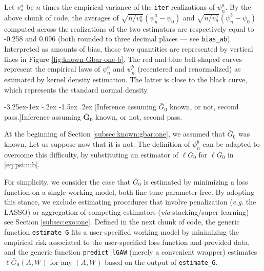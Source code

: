 \documentclass[]{article}
\makeatletter
\renewcommand\subsection{\@startsection{subsection}{3}{\z@}%
                                     {-3.25ex\@plus -1ex \@minus -.2ex}%
                                     {-1.5ex \@plus .2ex}%
                                     {\normalfont\normalsize\bfseries}}
\newcommand{\Gbar}{\bar{G}}
\theoremstyle{definition}
\theoremstyle{definition}
\theoremstyle{definition}
\theoremstyle{remark}
\makeatother
\begin{document}
Let \(v_{n}^{a}\) be \(n\) times the empirical variance of the
\texttt{iter} realizations of \(\psi_{n}^{a}\). By the above chunk of
code, the averages of \(\sqrt{n/v_{n}^{a}} (\psi_{n}^{a} - \psi_{0})\)
and \(\sqrt{n/v_{n}^{b}} (\psi_{n}^{b} - \psi_{0})\) computed across the
realizations of the two estimators are respectively equal to -0.258 and
0.096 (both rounded to three decimal places --- see \texttt{bias\_ab}).
Interpreted as amounts of bias, those two quantities are represented by
vertical lines in Figure \ref{fig:known-Gbar-one-b}. The red and blue
bell-shaped curves represent the empirical laws of \(\psi_{n}^{a}\) and
\(\psi_{n}^{b}\) (recentered and renormalized) as estimated by kernel
density estimation. The latter is close to the black curve, which
represents the standard normal density.

\subsection[Inference assuming $\Gbar_{0}$ known, or not, second pass.]{Inference assuming
$\boldsymbol{\Gbar_{0}}$ known, or not, second pass.} 
\label{subsec:known:gbar:two}

At the beginning of Section \ref{subsec:known:gbar:one}, we assumed that
\(\Gbar_{0}\) was known. Let us suppose now that it is not. The
definition of \(\psi_{n}^{b}\) can be adapted to overcome this
difficulty, by substituting an estimator of \(\ell\Gbar_{0}\) for
\(\ell\Gbar_{0}\) in \eqref{eq:psi:n:b}.

For simplicity, we consider the case that \(\Gbar_{0}\) is estimated by
minimizing a loss function on a single working model, both
fine-tune-parameter-free. By adopting this stance, we exclude estimating
procedures that involve penalization (\textit{e.g.} the LASSO) or
aggregation of competing estimators (\textit{via} stacking/super
learning) -- see Section \ref{subsec:exo:one}. Defined in the next chunk
of code, the generic function \texttt{estimate\_G} fits a user-specified
working model by minimizing the empirical risk associated to the
user-specified loss function and provided data, and the generic function
\texttt{predict\_lGAW} (merely a convenient wrapper) estimates
\(\ell\Gbar_{0}(A,W)\) for any \((A,W)\) based on the output of
\texttt{estimate\_G}.
\end{document}

